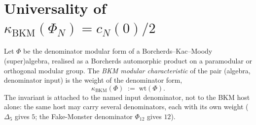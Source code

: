 \section{Universality of \texorpdfstring{$\kappa_{\mathrm{BKM}}(\Phi_N) = c_N(0)/2$}{kappa-BKM(Phi-N) = c-N(0)/2}}
\label{sec:cy-strat-bkm-universal}

\begin{definition}
\label{def:kappa-bkm-modular-characteristic}
Let $\Phi$ be the denominator modular form of a Borcherds--Kac--Moody
(super)algebra, realised as a Borcherds automorphic product on a
paramodular or orthogonal modular group. The \emph{BKM modular
characteristic} of the pair (algebra, denominator input) is the weight
of the denominator form,
\[
 \kappa_{\mathrm{BKM}}(\Phi) \;:=\; \mathrm{wt}(\Phi).
\]
The invariant is attached to the named input denominator, not to the
BKM host alone: the same host may carry several denominators, each
with its own weight ($\Delta_5$ gives $5$; the Fake-Monster
denominator $\Phi_{12}$ gives $12$).
\end{definition}

